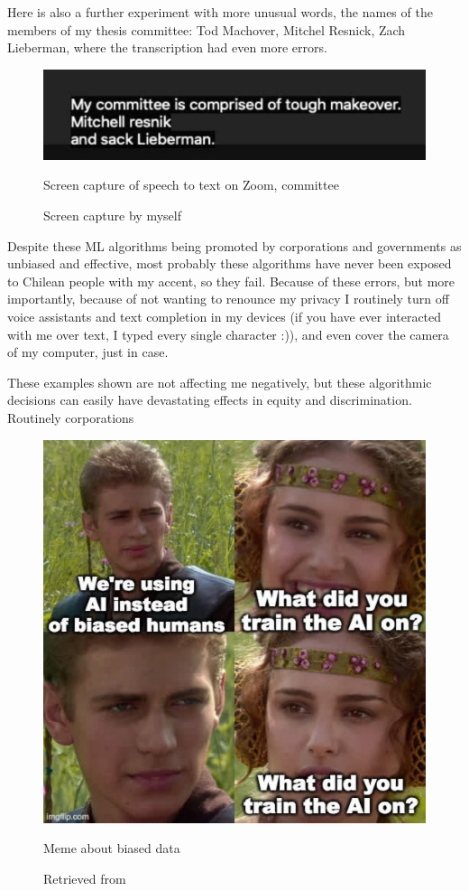 Here is also a further experiment with more unusual words, the names of the members of my thesis committee: Tod Machover, Mitchel Resnick, Zach Lieberman, where the transcription had even more errors.

\begin{figure}[ht]
  \centering
  \includegraphics[width=0.75\linewidth,height=0.25\textheight,keepaspectratio]{images/zoom-committee.jpg}
  \caption{Screen capture of speech to text on Zoom, committee}
  \caption*{Screen capture by myself}
  \label{fig:zoom-committee}
\end{figure}

Despite these \acrshort{ML} algorithms being promoted by corporations and governments as unbiased and effective, most probably these algorithms have never been exposed to Chilean people with my accent, so they fail. Because of these errors, but more importantly, because of not wanting to renounce my privacy I routinely turn off voice assistants and text completion in my devices (if you have ever interacted with me over text, I typed every single character :)), and even cover the camera of my computer, just in case.

These examples shown are not affecting me negatively, but these algorithmic decisions can easily have devastating effects in equity and discrimination. Routinely corporations 

\begin{figure}[ht]
  \centering
  \includegraphics[width=0.75\linewidth,height=0.25\textheight,keepaspectratio]{images/meme-star-wars.jpg}
  \caption{Meme about biased data}
  \caption*{Retrieved from \cite{website-twitter-janellecshane-meme}}
  \label{fig:meme-star-wars}
\end{figure}

